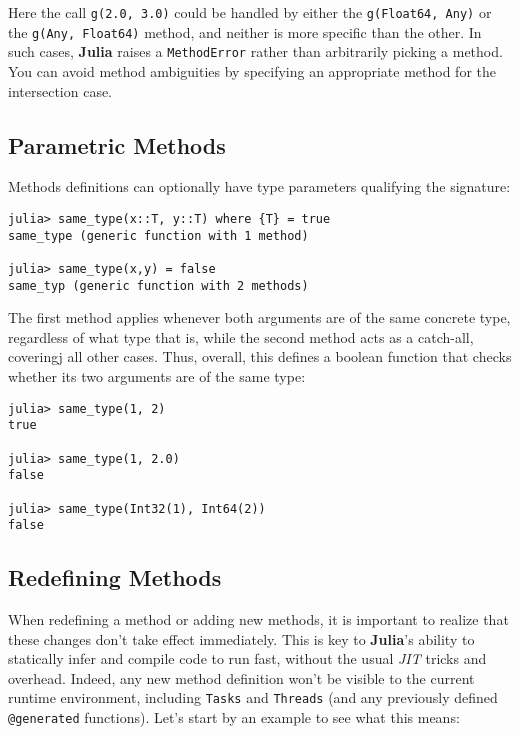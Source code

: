 \documentclass[
]{article}
\begin{document}
Here the call \texttt{g(2.0,\ 3.0)} could be handled by either the
\texttt{g(Float64,\ Any)} or the \texttt{g(Any,\ Float64)} method, and
neither is more specific than the other. In such cases, \textbf{Julia}
raises a \texttt{MethodError} rather than arbitrarily picking a method.
You can avoid method ambiguities by specifying an appropriate method for
the intersection case.

\hypertarget{parametric-methods}{%
\subsection{Parametric Methods}\label{parametric-methods}}

Methods definitions can optionally have type parameters qualifying the
signature:

\begin{verbatim}
julia> same_type(x::T, y::T) where {T} = true
same_type (generic function with 1 method)

julia> same_type(x,y) = false
same_typ (generic function with 2 methods)
\end{verbatim}

The first method applies whenever both arguments are of the same
concrete type, regardless of what type that is, while the second method
acts as a catch-all, coveringj all other cases. Thus, overall, this
defines a boolean function that checks whether its two arguments are of
the same type:

\begin{verbatim}
julia> same_type(1, 2)
true

julia> same_type(1, 2.0)
false

julia> same_type(Int32(1), Int64(2))
false
\end{verbatim}

\hypertarget{redefining-methods}{%
\subsection{Redefining Methods}\label{redefining-methods}}

When redefining a method or adding new methods, it is important to
realize that these changes don't take effect immediately. This is key to
\textbf{Julia}'s ability to statically infer and compile code to run
fast, without the usual \emph{JIT} tricks and overhead. Indeed, any new
method definition won't be visible to the current runtime environment,
including \texttt{Tasks} and \texttt{Threads} (and any previously
defined \texttt{@generated} functions). Let's start by an example to see
what this means:
\end{document}
